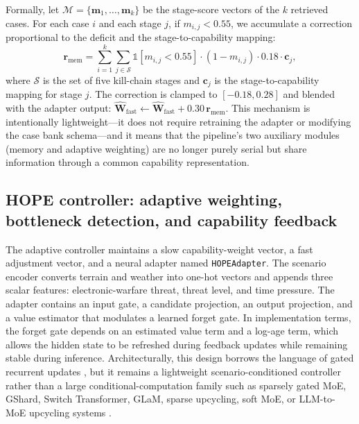Formally, let $\mathcal{M} = \{\mathbf{m}_1, \ldots, \mathbf{m}_k\}$ be the stage-score vectors of the $k$ retrieved cases. For each case $i$ and each stage $j$, if $m_{i,j} < 0.55$, we accumulate a correction proportional to the deficit and the stage-to-capability mapping:
\[
\mathbf{r}_{\text{mem}} = \sum_{i=1}^{k} \sum_{j \in \mathcal{S}} \mathbb{1}[m_{i,j} < 0.55] \cdot (1 - m_{i,j}) \cdot 0.18 \cdot \mathbf{c}_j,
\]
where $\mathcal{S}$ is the set of five kill-chain stages and $\mathbf{c}_j$ is the stage-to-capability mapping for stage $j$. The correction is clamped to $[-0.18, 0.28]$ and blended with the adapter output: $\hat{\mathbf{W}}_{\text{fast}} \leftarrow \hat{\mathbf{W}}_{\text{fast}} + 0.30\,\mathbf{r}_{\text{mem}}$. This mechanism is intentionally lightweight---it does not require retraining the adapter or modifying the case bank schema---and it means that the pipeline's two auxiliary modules (memory and adaptive weighting) are no longer purely serial but share information through a common capability representation.

\subsection{HOPE controller: adaptive weighting, bottleneck detection, and capability feedback}

The adaptive controller maintains a slow capability-weight vector, a fast adjustment vector, and a neural adapter named \texttt{HOPEAdapter}. The scenario encoder converts terrain and weather into one-hot vectors and appends three scalar features: electronic-warfare threat, threat level, and time pressure. The adapter contains an input gate, a candidate projection, an output projection, and a value estimator that modulates a learned forget gate. In implementation terms, the forget gate depends on an estimated value term and a log-age term, which allows the hidden state to be refreshed during feedback updates while remaining stable during inference. Architecturally, this design borrows the language of gated recurrent updates \citep{hochreiter1997lstm}, but it remains a lightweight scenario-conditioned controller rather than a large conditional-computation family such as sparsely gated MoE, GShard, Switch Transformer, GLaM, sparse upcycling, soft MoE, or LLM-to-MoE upcycling systems \citep{shazeer2017moe,lepikhin2021gshard,fedus2022switch,du2022glam,komatsuzaki2022sparseupcycling,puigcerver2024softmoe,doubov2024sparseupcyclinginference,he2024upcyclingllmmoe}.

